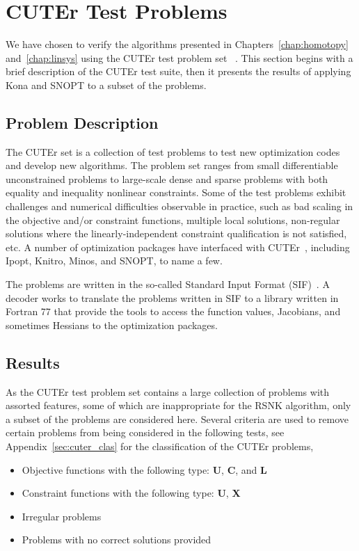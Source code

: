 \section{CUTEr Test Problems}\label{sec:cuter1}
We have chosen to verify the algorithms presented in Chapters~\ref{chap:homotopy} and~\ref{chap:linsys}  using the CUTEr test problem set ~\cite{cuter_opt, cuter_gould}. This section begins with a brief description of the CUTEr test suite, then it presents the results of applying Kona and SNOPT to a subset of the problems.

\subsection{Problem Description}
The CUTEr set is a collection of 
test problems to test new optimization codes and develop new algorithms. The problem set ranges from small differentiable unconstrained problems to large-scale dense and sparse problems with both equality and inequality nonlinear constraints.
Some of the test problems exhibit challenges and numerical difficulties observable in practice, such as bad scaling in the objective and/or constraint functions, multiple local solutions, non-regular solutions where the linearly-independent constraint qualification is not satisfied, etc. A number of optimization packages have interfaced with CUTEr~\cite{cuter_interface}, including Ipopt, Knitro, Minos, and SNOPT, to name a few.

The problems are written in the so-called Standard Input Format (SIF)~\cite{Conn1992}. A decoder works to translate the problems written in SIF to a library written in Fortran 77 that provide the tools to access the function values, Jacobians, and sometimes Hessians to the optimization packages. %

\subsection{Results}
As the CUTEr test problem set contains a large collection of problems with assorted features, some of which are inappropriate for the RSNK algorithm, only a subset of the problems are considered here. Several criteria are used to remove certain problems from being considered in the following tests, see Appendix~\ref{sec:cuter_clas} for the classification of the CUTEr problems, 
\begin{itemize} \itemsep -8pt 
\item Objective functions with the following type: \textbf{U},  \textbf{C}, and \textbf{L}
\item Constraint functions with the following type: \textbf{U},  \textbf{X}
\item Irregular problems 
\item Problems with no correct solutions provided
\end{itemize}

